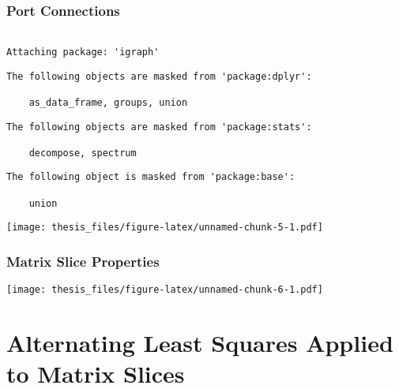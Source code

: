\documentclass[12pt,twoside]{dukestatscithesis}
\theoremstyle{definition}
\theoremstyle{definition}
\theoremstyle{definition}
\theoremstyle{remark}
\begin{document}
\subsection{Port Connections}\label{port-connections}
\begin{verbatim}

Attaching package: 'igraph'
\end{verbatim}
\begin{verbatim}
The following objects are masked from 'package:dplyr':

    as_data_frame, groups, union
\end{verbatim}
\begin{verbatim}
The following objects are masked from 'package:stats':

    decompose, spectrum
\end{verbatim}
\begin{verbatim}
The following object is masked from 'package:base':

    union
\end{verbatim}
\texttt{[image: thesis\_files/figure-latex/unnamed-chunk-5-1.pdf]}

\subsection{Matrix Slice Properties}\label{matrix-slice-properties}
\begin{Shaded}
\begin{Highlighting}[]
 \NormalTok{, } \NormalTok{,  }
           \NormalTok{(}\NormalTok{)[}\NormalTok{(}\NormalTok{(}\NormalTok{)):}\NormalTok{],}
           \NormalTok{)}
\end{Highlighting}
\end{Shaded}
\texttt{[image: thesis\_files/figure-latex/unnamed-chunk-6-1.pdf]}

\chapter{Alternating Least Squares Applied to Matrix
Slices}\label{alternating-least-squares-applied-to-matrix-slices}
\end{document}
